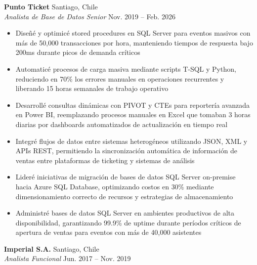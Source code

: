 \documentclass[11pt,letterpaper]{article}
\begin{document}
\textbf{Punto Ticket} \hfill Santiago, Chile\\
\textit{Analista de Base de Datos Senior} \hfill Nov. 2019 – Feb. 2026
\begin{itemize}
  \item Diseñé y optimicé stored procedures en SQL Server para eventos masivos con más de 50,000 transacciones por hora, manteniendo tiempos de respuesta bajo 200ms durante picos de demanda críticos
  \item Automaticé procesos de carga masiva mediante scripts T-SQL y Python, reduciendo en 70\% los errores manuales en operaciones recurrentes y liberando 15 horas semanales de trabajo operativo
  \item Desarrollé consultas dinámicas con PIVOT y CTEs para reportería avanzada en Power BI, reemplazando procesos manuales en Excel que tomaban 3 horas diarias por dashboards automatizados de actualización en tiempo real
  \item Integré flujos de datos entre sistemas heterogéneos utilizando JSON, XML y APIs REST, permitiendo la sincronización automática de información de ventas entre plataformas de ticketing y sistemas de análisis
  \item Lideré iniciativas de migración de bases de datos SQL Server on-premise hacia Azure SQL Database, optimizando costos en 30\% mediante dimensionamiento correcto de recursos y estrategias de almacenamiento
  \item Administré bases de datos SQL Server en ambientes productivos de alta disponibilidad, garantizando 99.9\% de uptime durante períodos críticos de apertura de ventas para eventos con más de 40,000 asistentes
\end{itemize}
\vspace{2pt}
\textbf{Imperial S.A.} \hfill Santiago, Chile\\
\textit{Analista Funcional} \hfill Jun. 2017 – Nov. 2019
\end{document}
